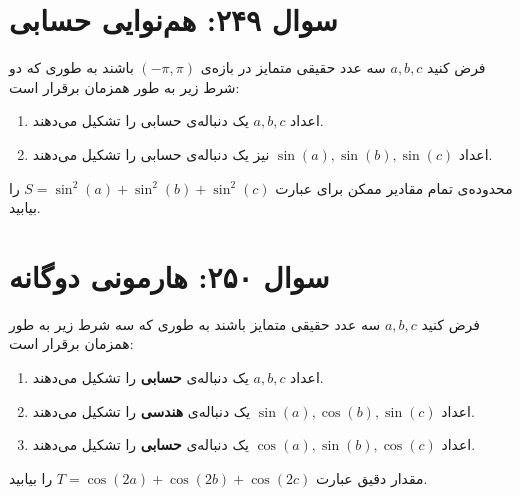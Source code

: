 \documentclass[12pt]{article}
\begin{document}
\section*{سوال ۲۴۹: هم‌نوایی حسابی}
فرض کنید \(a, b, c\) سه عدد حقیقی متمایز در بازه‌ی \((-\pi, \pi)\) باشند به طوری که دو شرط زیر به طور همزمان برقرار است:
\begin{enumerate}[label=(\roman*)]
	\item اعداد \(a, b, c\) یک دنباله‌ی حسابی را تشکیل می‌دهند.
	\item اعداد \(\sin(a), \sin(b), \sin(c)\) نیز یک دنباله‌ی حسابی را تشکیل می‌دهند.
\end{enumerate}
محدوده‌ی تمام مقادیر ممکن برای عبارت \(S = \sin^2(a) + \sin^2(b) + \sin^2(c)\) را بیابید.

\vspace{1cm}
\hrulefill
\vspace{1cm}

\section*{سوال ۲۵۰: هارمونی دوگانه}
فرض کنید \(a, b, c\) سه عدد حقیقی متمایز باشند به طوری که سه شرط زیر به طور همزمان برقرار است:
\begin{enumerate}[label=(\roman*)]
	\item اعداد \(a, b, c\) یک دنباله‌ی \textbf{حسابی} را تشکیل می‌دهند.
	\item اعداد \(\sin(a), \cos(b), \sin(c)\) یک دنباله‌ی \textbf{هندسی} را تشکیل می‌دهند.
	\item اعداد \(\cos(a), \sin(b), \cos(c)\) یک دنباله‌ی \textbf{حسابی} را تشکیل می‌دهند.
\end{enumerate}
مقدار دقیق عبارت \(T = \cos(2a) + \cos(2b) + \cos(2c)\) را بیابید.

\vspace{1cm}
\hrulefill
\vspace{1cm}
\end{document}
